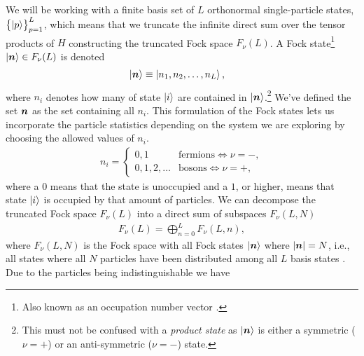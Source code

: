             We will be working with a finite basis set of $L$ orthonormal
            single-particle states, $\left\{ \ket{p} \right\}_{p = 1}^{L}$, which means
            that we truncate the infinite direct sum over the tensor products of
            $H$ constructing the truncated Fock space $F_{\nu}(L)$.
            A Fock state\footnote{%
                Also known as an occupation number vector
                \cite{helgaker-molecular}.
            } $\ket{\boldsymbol{n}} \in F_{\nu}(L)$ is denoted
            \begin{align}
                \ket{\boldsymbol{n}}
                &\equiv \ket{n_1, n_2, \dots, n_L},
            \end{align}
            where $n_i$ denotes how many of state $\ket{i}$ are contained in
            $\ket{\boldsymbol{n}}$.\footnote{%
                This must not be confused with a \emph{product state} as
                $\ket{\boldsymbol{n}}$ is either a symmetric ($\nu = +$) or an
                anti-symmetric ($\nu = -$) state.%
            }
            We've defined the set $\boldsymbol{n}$ as the set containing all $n_i$.
            This formulation of the Fock states lets us incorporate the particle
            statistics depending on the system we are exploring by choosing the
            allowed values of $n_i$.
            \begin{align}
                n_i =
                \begin{cases}
                    0, 1 & \text{fermions} \iff \nu = -, \\
                    0, 1, 2, \dots & \text{bosons} \iff \nu = +,
                \end{cases}
            \end{align}
            where a $0$ means that the state is unoccupied and a $1$, or higher,
            means that state $\ket{i}$ is occupied by that amount of particles.
            We can decompose the truncated Fock space $F_{\nu}(L)$ into a direct
            sum of subspaces $F_{\nu}(L, N)$
            \begin{align}
                F_{\nu}(L)
                = \bigoplus_{n = 0}^{L}
                F_{\nu}(L, n),
            \end{align}
            where $F_{\nu}(L, N)$ is the Fock space with all Fock states
            $\ket{\boldsymbol{n}}$ where $\abs{\boldsymbol{n}} = N$, i.e., all states where
            all $N$ particles have been distributed among all $L$ basis states
            \cite{helgaker-molecular}.
            Due to the particles being indistinguishable we have

